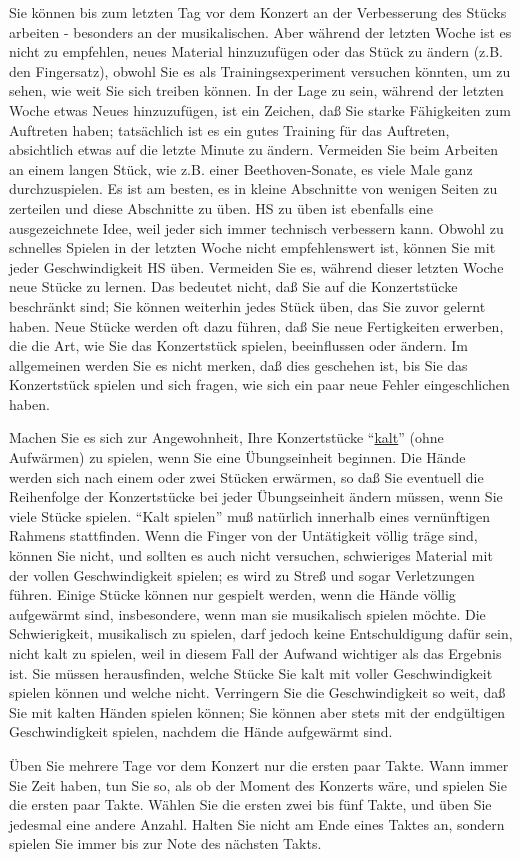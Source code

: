 Sie können bis zum letzten Tag vor dem Konzert an der Verbesserung des Stücks arbeiten - besonders an der musikalischen.
Aber während der letzten Woche ist es nicht zu empfehlen, neues Material hinzuzufügen oder das Stück zu ändern (z.B. den Fingersatz), obwohl Sie es als Trainingsexperiment versuchen könnten, um zu sehen, wie weit Sie sich treiben können.
In der Lage zu sein, während der letzten Woche etwas Neues hinzuzufügen, ist ein Zeichen, daß Sie starke Fähigkeiten zum Auftreten haben; tatsächlich ist es ein gutes Training für das Auftreten, absichtlich etwas auf die letzte Minute zu ändern.
Vermeiden Sie beim Arbeiten an einem langen Stück, wie z.B. einer Beethoven-Sonate, es viele Male ganz durchzuspielen.
Es ist am besten, es in kleine Abschnitte von wenigen Seiten zu zerteilen und diese Abschnitte zu üben.
HS zu üben ist ebenfalls eine ausgezeichnete Idee, weil jeder sich immer technisch verbessern kann.
Obwohl zu schnelles Spielen in der letzten Woche nicht empfehlenswert ist, können Sie mit jeder Geschwindigkeit HS üben.
Vermeiden Sie es, während dieser letzten Woche neue Stücke zu lernen.
Das bedeutet nicht, daß Sie auf die Konzertstücke beschränkt sind; Sie können weiterhin jedes Stück üben, das Sie zuvor gelernt haben.
Neue Stücke werden oft dazu führen, daß Sie neue Fertigkeiten erwerben, die die Art, wie Sie das Konzertstück spielen, beeinflussen oder ändern.
Im allgemeinen werden Sie es nicht merken, daß dies geschehen ist, bis Sie das Konzertstück spielen und sich fragen, wie sich ein paar neue Fehler eingeschlichen haben.

Machen Sie es sich zur Angewohnheit, Ihre Konzertstücke \enquote{\hyperlink{c1iii6g}{kalt}} (ohne Aufwärmen) zu spielen, wenn Sie eine Übungseinheit beginnen.
Die Hände werden sich nach einem oder zwei Stücken erwärmen, so daß Sie eventuell die Reihenfolge der Konzertstücke bei jeder Übungseinheit ändern müssen, wenn Sie viele Stücke spielen.
\enquote{Kalt spielen} muß natürlich innerhalb eines vernünftigen Rahmens stattfinden.
Wenn die Finger von der Untätigkeit völlig träge sind, können Sie nicht, und sollten es auch nicht versuchen, schwieriges Material mit der vollen Geschwindigkeit spielen; es wird zu Streß und sogar Verletzungen führen.
Einige Stücke können nur gespielt werden, wenn die Hände völlig aufgewärmt sind,
insbesondere, wenn man sie musikalisch spielen möchte.
Die Schwierigkeit, musikalisch zu spielen, darf jedoch keine Entschuldigung dafür sein, nicht kalt zu spielen, weil in diesem Fall der Aufwand wichtiger als das Ergebnis ist.
Sie müssen herausfinden, welche Stücke Sie kalt mit voller Geschwindigkeit spielen können und welche nicht.
Verringern Sie die Geschwindigkeit so weit, daß Sie mit kalten Händen spielen können; Sie können aber stets mit der endgültigen Geschwindigkeit spielen, nachdem die Hände aufgewärmt sind. 

Üben Sie mehrere Tage vor dem Konzert nur die ersten paar Takte.
Wann immer Sie Zeit haben, tun Sie so, als ob der Moment des Konzerts wäre, und spielen Sie die ersten paar Takte. 
Wählen Sie die ersten zwei bis fünf Takte, und üben Sie jedesmal eine andere Anzahl.
Halten Sie nicht am Ende eines Taktes an, sondern spielen Sie immer bis zur Note des nächsten Takts.



